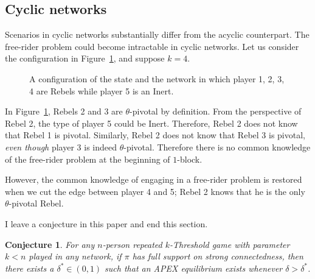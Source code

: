 \documentclass[12pt,letter]{article}
\newtheorem{conjecture}{Conjecture}[section]
\theoremstyle{definition}
\theoremstyle{remark}
\theoremstyle{claim}
\begin{document}
\subsection{Cyclic networks}
\label{sec:cyclic}


Scenarios in cyclic networks substantially differ from the acyclic counterpart. The free-rider problem could become intractable in cyclic networks. Let us consider the configuration in Figure~\ref{fig:cyclic_network}, and suppose $k=4$.

\begin{figure}[!h]

\begin{center}
\end{center}
\caption{A configuration of the state and the network in which player 1, 2, 3, 4 are Rebels while player 5 is an Inert.}
\label{fig:cyclic_network}
\end{figure}

In Figure~\ref{fig:cyclic_network}, Rebels 2 and 3 are $\theta$-pivotal by definition. From the perspective of Rebel 2, the type of player 5 could be Inert. Therefore, Rebel 2 does not know that Rebel 1 is pivotal. Similarly, Rebel 2 does not know that Rebel 3 is pivotal, \textit{even though} player 3 is indeed $\theta$-pivotal. Therefore there is no common knowledge of the free-rider problem at the beginning of $1$-block. 

However, the common knowledge of engaging in a free-rider problem is restored when we cut the edge between player 4 and 5; Rebel 2 knows that he is the only $\theta$-pivotal Rebel.

I leave a conjecture in this paper and end this section.

\begin{conjecture}
For any $n$-person repeated $k$-Threshold game with parameter $ k < n$ played in any network,
if $\pi$ has full support on strong connectedness, then there exists a $\delta^{*}\in (0,1)$ such that an APEX equilibrium exists whenever $\delta>\delta^{*}$.
\end{conjecture}
%
%
%
\end{document}

